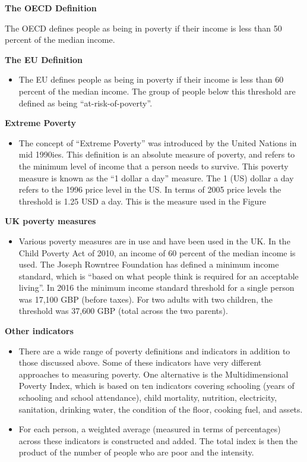\documentclass[
]{book}
\providecommand{\tightlist}{%
  \setlength{\itemsep}{0pt}\setlength{\parskip}{0pt}}
\begin{document}
\textbf{The OECD Definition}

The OECD defines people as being in poverty if their income is less than 50 percent of the median income.

\textbf{The EU Definition}

\begin{itemize}
\tightlist
\item
  The EU defines people as being in poverty if their income is less than 60 percent of the median income. The group of people below this threshold are defined as being ``at-risk-of-poverty''.
\end{itemize}

\textbf{Extreme Poverty}

\begin{itemize}
\tightlist
\item
  The concept of ``Extreme Poverty'' was introduced by the United Nations in mid 1990ies. This definition is an absolute measure of poverty, and refers to the minimum level of income that a person needs to survive. This poverty measure is known as the ``1 dollar a day'' measure. The 1 (US) dollar a day refers to the 1996 price level in the US. In terms of 2005 price levels the threshold is 1.25 USD a day. This is the measure used in the Figure
\end{itemize}

\textbf{UK poverty measures}

\begin{itemize}
\tightlist
\item
  Various poverty measures are in use and have been used in the UK. In the Child Poverty Act of 2010, an income of 60 percent of the median income is used. The Joseph Rowntree Foundation has defined a minimum income standard, which is ``based on what people think is required for an acceptable living''. In 2016 the minimum income standard threshold for a single person was 17,100 GBP (before taxes). For two adults with two children, the threshold was 37,600 GBP (total across the two parents).
\end{itemize}

\textbf{Other indicators}

\begin{itemize}
\item
  There are a wide range of poverty definitions and indicators in addition to those discussed above. Some of these indicators have very different approaches to measuring poverty. One alternative is the Multidimensional Poverty Index, which is based on ten indicators covering schooling (years of schooling and school attendance), child mortality, nutrition, electricity, sanitation, drinking water, the condition of the floor, cooking fuel, and assets.
\item
  For each person, a weighted average (measured in terms of percentages) across these indicators is constructed and added. The total index is then the product of the number of people who are poor and the intensity.
\end{itemize}
\end{document}
